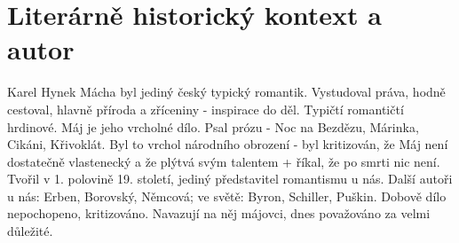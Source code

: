 \documentclass[11pt]{article}
\begin{document}
    \section*{Literárně historický kontext a autor}
    Karel Hynek Mácha byl jediný český typický romantik.
    Vystudoval práva, hodně cestoval, hlavně příroda a zříceniny - inspirace do děl.
    Typičtí romantičtí hrdinové.
    Máj je jeho vrcholné dílo.
    Psal prózu - Noc na Bezdězu, Márinka, Cikáni, Křivoklát.
    Byl to vrchol národního obrození - byl kritizován, že Máj není dostatečně vlastenecký a že plýtvá svým talentem + říkal, že po smrti nic není.
    Tvořil v 1. polovině 19. století, jediný představitel romantismu u nás.
    Další autoři u nás: Erben, Borovský, Němcová; ve světě: Byron, Schiller, Puškin.
    Dobově dílo nepochopeno, kritizováno. Navazují na něj májovci, dnes považováno za velmi důležité.
\end{document}
